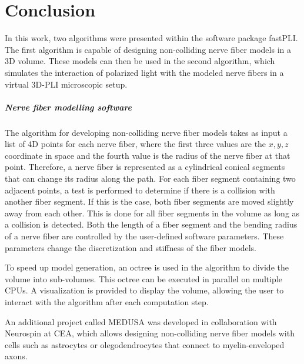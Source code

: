 \cleardoublepage
\setcounter{chapter}{10}
\chapter{Conclusion}
\label{sec:conclusion}
% 
In this work, two algorithms were presented within the software package \ac{fastPLI}.
The first algorithm is capable of designing non-colliding nerve fiber models in a 3D volume.
These models can then be used in the second algorithm, which simulates the interaction of polarized light with the modeled nerve fibers in a virtual \ac{3D-PLI} microscopic setup.
% 
% 
% 
\paragraph{Nerve fiber modelling software}
% 
The algorithm for developing non-colliding nerve fiber models takes as input a list of 4D points for each nerve fiber, where the first three values are the $x,y,z$ coordinate in space and the fourth value is the radius of the nerve fiber at that point.
Therefore, a nerve fiber is represented as a cylindrical conical segments that can change its radius along the path.
For each fiber segment containing two adjacent points, a test is performed to determine if there is a collision with another fiber segment.
If this is the case, both fiber segments are moved slightly away from each other.
This is done for all fiber segments in the volume as long as a collision is detected.
Both the length of a fiber segment and the bending radius of a nerve fiber are controlled by the user-defined software parameters.
These parameters change the discretization and stiffness of the fiber models.
\par
% 
To speed up model generation, an octree is used in the algorithm to divide the volume into sub-volumes.
This octree can be executed in parallel on multiple \acp{CPU}.
A visualization is provided to display the volume, allowing the user to interact with the algorithm after each computation step.
\par
% 
An additional project called \ac{MEDUSA} was developed in collaboration with Neurospin at \ac{CEA}, which allows designing non-colliding nerve fiber models with cells such as astrocytes or olegodendrocytes that connect to myelin-enveloped axons.
% 
% 
% 
